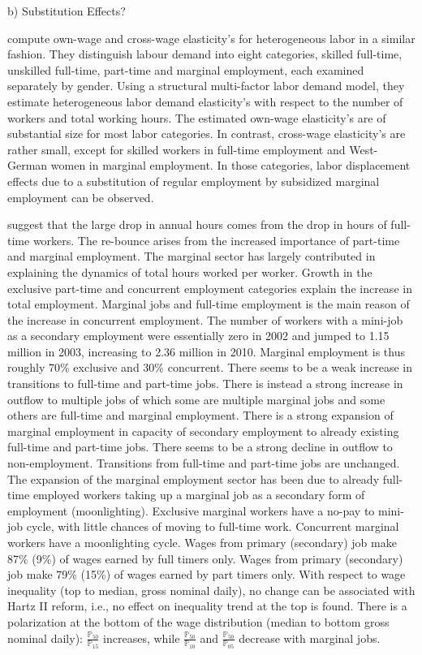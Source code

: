 \documentclass[12pt, a4paper]{article}
\begin{document}
b) Substitution Effects?

\cite{FreierSteiner07a} compute own-wage and cross-wage elasticity’s for
heterogeneous labor in a similar fashion. They distinguish labour demand into eight
categories, skilled full-time, unskilled full-time, part-time and marginal employment, each examined separately by gender. Using a structural multi-factor labor demand model, they estimate heterogeneous labor demand elasticity’s with respect to the number of workers and total working hours. The estimated own-wage elasticity’s are of substantial size for most labor categories. In contrast, cross-wage elasticity’s are rather small, except for skilled workers in full-time employment and West-German women in marginal employment. In those categories, labor displacement effects due to a substitution of regular employment by subsidized marginal employment can be observed.

\cite{CarriTuRo15} suggest that the large drop in annual hours comes from the drop in hours of full-time workers. The re-bounce arises from the increased importance of part-time and marginal employment. The marginal sector has largely contributed in explaining the dynamics of total hours worked per worker. Growth in the exclusive part-time and concurrent employment categories explain the increase in total employment. Marginal jobs and full-time employment is the main reason of the increase in concurrent employment. The number of workers with a mini-job as a secondary employment were essentially zero in 2002 and jumped to 1.15 million in 2003, increasing to 2.36 million in 2010. Marginal employment is thus roughly 70\% exclusive and 30\% concurrent. There seems to be a weak increase in transitions to full-time and part-time jobs. There is instead a strong increase in outflow to multiple jobs of which some are multiple marginal jobs and some others are full-time and marginal employment. There is a strong expansion of marginal employment in capacity of secondary employment to already existing full-time and part-time jobs. There seems to be a strong decline in outflow to non-employment. Transitions from full-time and part-time jobs are unchanged. The expansion of the marginal employment sector has been due to already full-time employed workers taking up a marginal job as a secondary form of employment (moonlighting). Exclusive marginal workers have a no-pay to mini-job cycle, with little chances of moving to full-time work. Concurrent marginal workers have a moonlighting cycle. Wages from primary (secondary) job make 87\% (9\%) of wages earned by full timers only. Wages from primary (secondary) job make 79\% (15\%) of wages earned by part timers only. With respect to wage inequality (top to median, gross nominal daily), no change can be associated with Hartz II reform, i.e., no effect on inequality trend at the top is found. There is a polarization at the bottom of the wage distribution (median to bottom gross nominal daily): $\frac{\mathbb{P}_{50}}{\mathbb{P}_{15}}$ increases, while $\frac{\mathbb{P}_{50}}{\mathbb{P}_{10}}$ and $\frac{\mathbb{P}_{50}}{\mathbb{P}_{05}}$ decrease with marginal jobs. 
\end{document}
